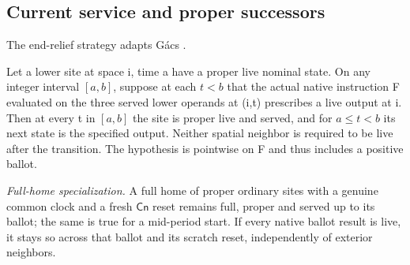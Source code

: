 \subsection{Current service and proper successors}
The end-relief strategy adapts G\'acs \cite[Section~16]{gacs86}.
\begin{lemma}\label{lem:endpoint}
Let a lower site at space i, time a have a proper live nominal state. On any integer interval \([a,b]\), suppose at each \(t<b\) that the actual native instruction F evaluated on the three served lower operands at (i,t) prescribes a live output at i. Then at every t in \([a,b]\) the site is proper live and served, and for \(a\le t<b\) its next state is the specified output. Neither spatial neighbor is required to be live after the transition. The hypothesis is pointwise on F and thus includes a positive ballot.
\end{lemma}
\noindent\emph{Full-home specialization.} A full home of proper ordinary sites with a genuine common clock and a fresh \(\mathsf{Cn}\) reset remains full, proper and served up to its ballot; the same is true for a mid-period start. If every native ballot result is live, it stays so across that ballot and its scratch reset, independently of exterior neighbors.
